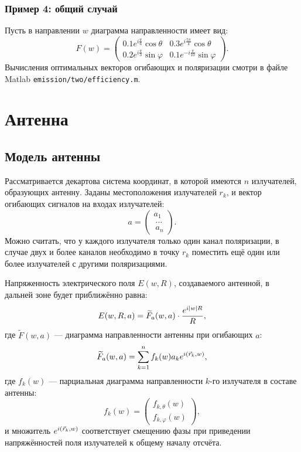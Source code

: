 \subsubsection{Пример 4: общий случай}

Пусть в направлении $w$ диаграмма направленности имеет вид:
\[
    F(w)
    =
    \begin{pmatrix}
        0.1 e^{i \frac{\pi}{6}} \cos \theta  & 0.3 e^{i \frac{5 \pi}{4}} \cos \theta   \\
        0.2 e^{i \frac{\pi}{3}} \sin \varphi & 0.1 e^{- i \frac{\pi}{10}} \sin \varphi
    \end{pmatrix} .
\]
Вычисления оптимальных векторов огибающих и поляризации смотри в файле Matlab \texttt{emission/two/efficiency.m}.


\section{Антенна}

\subsection{Модель антенны}

Рассматривается декартова система координат, в которой имеются $n$ излучателей, образующих антенну. Заданы местоположения излучателей $r_k$, и вектор огибающих
сигналов на входах излучателей:
\[
    a
    = \begin{pmatrix}
          a_1   \\\
          \dots \\\
          a_n
    \end{pmatrix} .
\]
Можно считать, что у каждого излучателя только один канал поляризации, в случае двух и более каналов необходимо в точку $r_k$ поместить ещё один или более
излучателей с другими поляризациями.

Напряженность электрического поля $E(w,R)$, создаваемого антенной, в дальней зоне будет приближённо равна:
\[
    E(w,R,a) = \widetilde{F}_a(w,a) \cdot \frac{e^{i \left | w \right | R}}{R} ,
\]
где $\widetilde{F}(w,a)$ --- диаграмма направленности антенны при огибающих $a$:
\[
    \widetilde{F}_a(w,a) = \sum_{k=1}^n f_k(w) a_k e^{i \left ( \vec{r}_k, w \right )} ,
\]
где $f_k(w)$ --- парциальная диаграмма направленности $k$-го излучателя в составе антенны:
\[
    f_k(w) =
    \begin{pmatrix}
        f_{k,\theta}(w) \\
        f_{k,\varphi}(w)
    \end{pmatrix}
    ,
\]
и множитель $e^{i \left ( \vec{r}_k, w \right )}$ соответствует смещению фазы при приведении напряжённостей поля излучателей к общему началу отсчёта.

